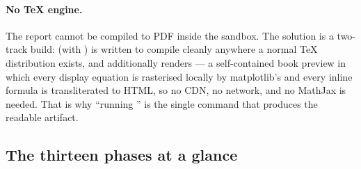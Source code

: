 \paragraph{No TeX engine.} The report cannot be compiled to PDF inside the sandbox. The
solution is a two-track build:  (with )
is written to compile cleanly anywhere a normal TeX distribution exists, and
 additionally renders  --- a
self-contained book preview in which every display equation is rasterised locally by
matplotlib's  and every inline formula is transliterated to HTML, so no
CDN, no network, and no MathJax is needed. That is why ``running
'' is the single command that produces the readable
artifact.

\subsection{The thirteen phases at a glance}
\label{sec:phasemap:table}

